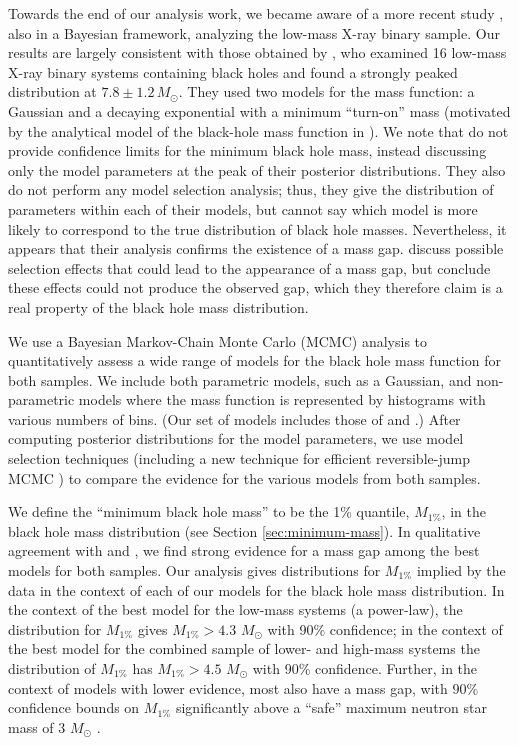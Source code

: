 \documentclass[preprint]{aastex}
\newcommand{\Msun}{M_\odot}
\begin{document}
Towards the end of our analysis work, we became aware of a more recent
study \citep{Ozel2010}, also in a Bayesian framework, analyzing the
low-mass X-ray binary sample.  Our results are largely consistent with
those obtained by \citet{Ozel2010}, who examined 16 low-mass X-ray
binary systems containing black holes and found a strongly peaked
distribution at $7.8 \pm 1.2 \, \Msun$.  They used two models for the
mass function: a Gaussian and a decaying exponential with a minimum
``turn-on'' mass (motivated by the analytical model of the black-hole
mass function in \citet{Fryer2001}).  We note that \citet{Ozel2010} do
not provide confidence limits for the minimum black hole mass, instead
discussing only the model parameters at the peak of their posterior
distributions.  They also do not perform any model selection analysis;
thus, they give the distribution of parameters within each of their
models, but cannot say which model is more likely to correspond to the
true distribution of black hole masses.  Nevertheless, it appears that
their analysis confirms the existence of a mass gap.  \citet{Ozel2010}
discuss possible selection effects that could lead to the appearance
of a mass gap, but conclude these effects could not produce the
observed gap, which they therefore claim is a real property of the
black hole mass distribution.

We use a Bayesian Markov-Chain Monte Carlo (MCMC) analysis to
quantitatively assess a wide range of models for the black hole mass
function for both samples.  We include both parametric models, such
as a Gaussian, and non-parametric models where the mass function is
represented by histograms with various numbers of bins.  (Our set of
models includes those of \citet{Ozel2010} and \citet{Bailyn1998}.)
After computing posterior distributions for the model parameters, we
use model selection techniques (including a new technique for
efficient reversible-jump MCMC \citep{Farr2010}) to compare the
evidence for the various models from both samples.

We define the ``minimum black hole mass'' to be the 1\% quantile,
$M_{1\%}$, in the black hole mass distribution (see Section
\ref{sec:minimum-mass}).  In qualitative agreement with
\citet{Ozel2010} and \citet{Bailyn1998}, we find strong evidence for a
mass gap among the best models for both samples.  Our analysis gives
distributions for $M_{1\%}$ implied by the data in the context of each
of our models for the black hole mass distribution.  In the context of
the best model for the low-mass systems (a power-law), the
distribution for $M_{1\%}$ gives $M_{1\%} > 4.3$ $\Msun$ with 90\%
confidence; in the context of the best model for the combined sample
of lower- and high-mass systems the distribution of $M_{1\%}$ has
$M_{1\%} > 4.5$ $\Msun$ with 90\% confidence.  Further, in the context
of models with lower evidence, most also have a mass gap, with 90\%
confidence bounds on $M_{1\%}$ significantly above a ``safe'' maximum
neutron star mass of 3 $\Msun$ \citep{Kalogera1996}.
\end{document}

